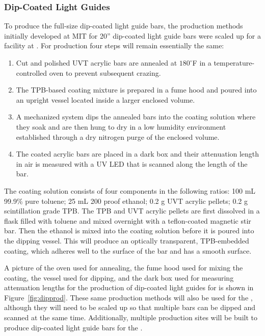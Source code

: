 \subsubsection{Dip-Coated Light Guides}
\label{ssec:fdsp-pd-pc-prod-bar1}

To produce the full-size   dip-coated light guide bars, the production methods initially developed at MIT for 20'' dip-coated light guide bars were scaled up for a facility at . For  production four steps will remain essentially the same:

\begin{enumerate}
\item Cut and polished UVT acrylic bars are annealed at $180^{\circ}$F in a temperature-controlled oven to prevent subsequent crazing.
\item The TPB-based coating mixture is prepared in a fume hood and poured into an upright vessel located inside a larger enclosed volume.
\item A mechanized system dips the annealed bars into the coating solution where they soak and are then hung to dry in a low humidity environment established through a dry nitrogen purge of the enclosed volume.
\item The coated acrylic bars are placed in a dark box and their attenuation length in air is measured with a UV LED that is scanned along the length of the bar.
\end{enumerate}

The coating solution consists of four components in the following ratios: 100 mL 99.9\% pure toluene; 25 mL 200 proof ethanol; 0.2 g UVT acrylic pellets; 0.2 g scintillation grade TPB. The TPB and UVT acrylic pellets are first dissolved in a flask filled with toluene and mixed overnight with a teflon-coated magnetic stir bar.  Then the ethanol is mixed into the coating solution before it is poured into the dipping vessel.  This will produce an optically transparent, TPB-embedded coating, which adheres well to the surface of the bar and has a smooth surface.

A picture of the oven used for annealing, the fume hood used for mixing the coating, the vessel used for dipping, and the dark box used for measuring attenuation lengths for the production of dip-coated light guides for  is shown in Figure~\ref{fig:dipprod}.  These same production methods will also be used for the  , although they will need to be scaled up so that multiple bars can be dipped and scanned at the same time.  Additionally, multiple production sites will be built to produce dip-coated light guide bars for the  .

